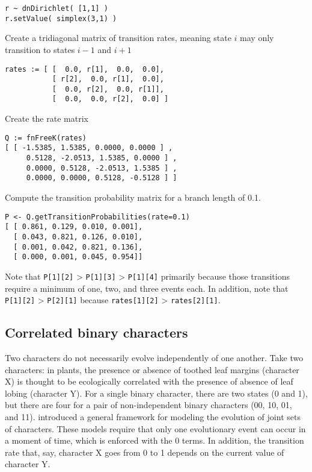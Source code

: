 {\tt \begin{snugshade*}
\begin{lstlisting}
r ~ dnDirichlet( [1,1] )
r.setValue( simplex(3,1) )
\end{lstlisting}
\end{snugshade*}}

Create a tridiagonal matrix of transition rates, meaning state $i$ may only transition to states $i-1$ and $i+1$

{\tt \begin{snugshade*}
\begin{lstlisting}
rates := [ [  0.0, r[1],  0.0,  0.0],
           [ r[2],  0.0, r[1],  0.0],
           [  0.0, r[2],  0.0, r[1]],
           [  0.0,  0.0, r[2],  0.0] ]
\end{lstlisting}
\end{snugshade*}}

Create the rate matrix

{\tt \begin{snugshade*}
\begin{lstlisting}
Q := fnFreeK(rates)
[ [ -1.5385, 1.5385, 0.0000, 0.0000 ] ,
     0.5128, -2.0513, 1.5385, 0.0000 ] ,
     0.0000, 0.5128, -2.0513, 1.5385 ] ,
     0.0000, 0.0000, 0.5128, -0.5128 ] ]
\end{lstlisting}
\end{snugshade*}}

Compute the transition probability matrix for a branch length of 0.1.

{\tt \begin{snugshade*}
\begin{lstlisting}
P <- Q.getTransitionProbabilities(rate=0.1)
[ [ 0.861, 0.129, 0.010, 0.001],
  [ 0.043, 0.821, 0.126, 0.010],
  [ 0.001, 0.042, 0.821, 0.136],
  [ 0.000, 0.001, 0.045, 0.954]]
\end{lstlisting}
\end{snugshade*}}

Note that {\tt P[1][2]} > {\tt P[1][3]} > {\tt P[1][4]} primarily because those transitions require a minimum of one, two, and three events each.
In addition, note that {\tt P[1][2]} > {\tt P[2][1]} because {\tt rates[1][2]} > {\tt rates[2][1]}.


\subsection{Correlated binary characters}

Two characters do not necessarily evolve independently of one another.
Take two characters: in plants, the presence or absence of toothed leaf margins (character X) is thought to be ecologically correlated with the presence of absence of leaf lobing (character Y).
For a single binary character, there are two states (0 and 1), but there are four for a pair of non-independent binary characters (00, 10, 01, and 11).
\citet{pagel94} introduced a general framework for modeling the evolution of joint sets of characters.
These models require that only one evolutionary event can occur in a moment of time, which is enforced with the 0 terms.
In addition, the transition rate that, say, character X goes from 0 to 1 depends on the current value of character Y.

